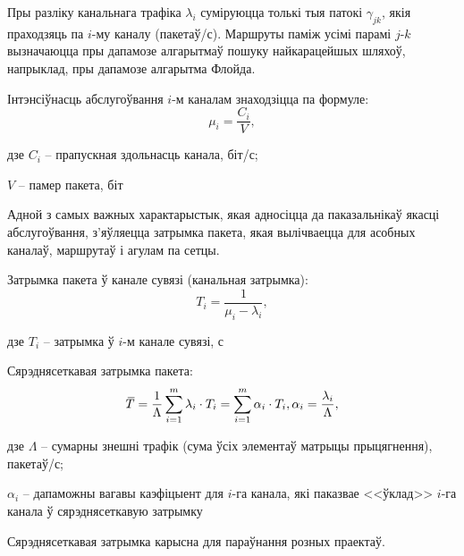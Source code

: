 Пры разліку канальнага трафіка $\lambda_i$ суміруюцца толькі тыя патокі
$\gamma_{jk}$, якія праходзяць па $i$-му каналу (пакетаў/с).
Маршруты паміж усімі парамі $j$-$k$ вызначаюцца пры дапамозе
алгарытмаў пошуку найкарацейшых шляхоў, напрыклад, пры дапамозе
алгарытма Флойда.

Інтэнсіўнасць абслугоўвання $i$-м каналам знаходзіцца па формуле:
\begin{equation}
    \mu_i = \frac{C_i}{V},
\end{equation}
\begin{Explanation}
    \item[дзе] $C_i$ -- прапускная здольнасць канала, біт/с;
    \item $V$ -- памер пакета, біт
\end{Explanation}

Адной з самых важных характарыстык, якая адносіцца да паказальнікаў
якасці абслугоўвання, з'яўляецца затрымка пакета, якая
вылічваецца для асобных каналаў, маршрутаў і агулам па сетцы.

Затрымка пакета ў канале сувязі (канальная затрымка):
\begin{equation}
    T_i = \frac{1}{\mu_i - \lambda_i},
\end{equation}
\begin{Explanation}
    \item[дзе] $T_i$ -- затрымка ў $i$-м канале сувязі, с
\end{Explanation}
Сярэднясеткавая затрымка пакета:
\begin{equation}
    {}\mkern3mu\overline{\mkern-3muT} =
        \frac{1}{\Lambda}\sum_{i = 1}^{m} {\lambda_i \cdot T_i} =
        \sum_{i = 1}^{m} {\alpha_i \cdot T_i},
        \alpha_i = \frac{\lambda_i}{\Lambda},
\end{equation}
\begin{Explanation}
    \item[дзе] $\Lambda$ -- сумарны знешні трафік
                            (сума ўсіх элементаў матрыцы
                            прыцягнення), пакетаў/с;
    \item $\alpha_i$ -- дапаможны вагавы каэфіцыент для
                        $i$-га канала, які паказвае
                        <<ўклад>> $i$-га канала ў
                        сярэднясеткавую затрымку
\end{Explanation}

Сярэднясеткавая затрымка карысна для параўнання розных праектаў.

